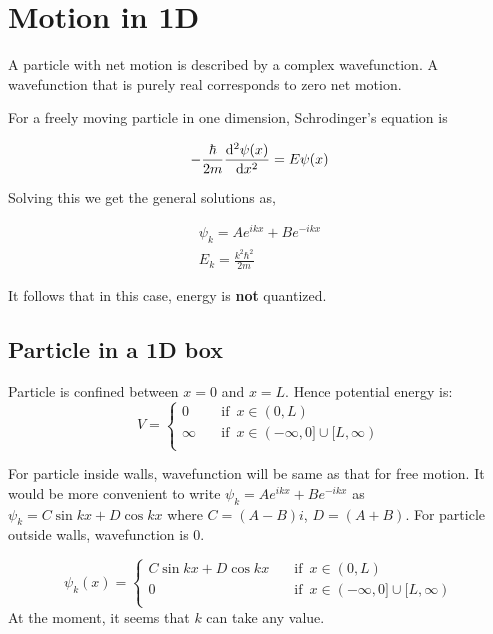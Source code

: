 \documentclass[11pt]{article}
\theoremstyle{definition}
\begin{document}
\section{Motion in 1D}

A particle with net motion is described by a complex wavefunction. A wavefunction that is purely real corresponds to zero net motion.

For a freely moving particle in one dimension, Schrodinger's equation is

\begin{shaded}
\begin{equation*}
    - \frac{\hbar}{2m} \dv[2]{\psi(x)}{x} = E \psi(x)
\end{equation*}

Solving this we get the general solutions as,

\begin{gather*}
    \psi_k = Ae^{ikx} + Be^{-ikx}\\
    E_k = \frac{k^2 \hbar^2}{2m}
\end{gather*}
\end{shaded}

It follows that in this case, energy is \textbf{not} quantized.

\subsection{Particle in a 1D box}

Particle is confined between $x=0$ and $x=L$. Hence potential energy is:
\begin{equation*}
V=\begin{cases}
          0 \quad &\text{if } \, x \in (0,L) \\
          \infty \quad &\text{if } \, x \in (-\infty,0] \cup [L, \infty) \\
     \end{cases}
\end{equation*}

For particle inside walls, wavefunction will be same as that for free motion. It would be more convenient to write $\psi_k =Ae^{ikx} + Be^{-ikx}$ as $\psi_k = C\sin{kx} + D \cos{kx}$ where $C = (A-B)i$, $D = (A+B)$. For particle outside walls, wavefunction is 0.

\begin{equation*}
\psi_k(x) =\begin{cases}
          C\sin{kx} + D \cos{kx} \quad &\text{if } \, x \in (0,L) \\
          0 \quad &\text{if } \, x \in (-\infty,0] \cup [L, \infty) \\
     \end{cases}
\end{equation*}
At the moment, it seems that $k$ can take any value.
\end{document}
